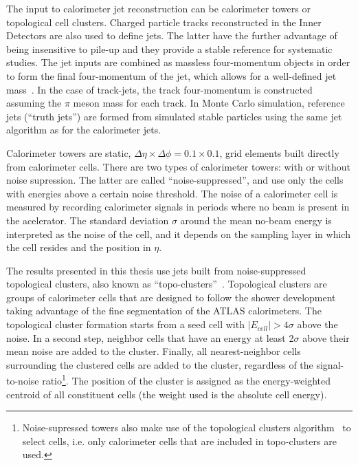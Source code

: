 The input to calorimeter jet reconstruction can be calorimeter towers or topological cell clusters. Charged particle tracks reconstructed in the Inner Detectors are also used to define jets. The latter have the further advantage of being insensitive to pile-up and they provide a stable reference for systematic studies. The jet inputs are combined as massless four-momentum objects in order to form the final four-momentum of the jet, which allows for a well-defined jet mass~\cite{Busato:1271710}. In the case of track-jets, the track four-momentum is constructed assuming the $\pi$ meson mass for each track.  In Monte Carlo simulation, reference jets (``truth jets'') are formed from simulated stable particles using the same jet algorithm as for the calorimeter jets. 


Calorimeter towers are static, $\Delta \eta \times \Delta \phi = 0.1 \times 0.1$, grid elements built directly from calorimeter cells. There are two types of calorimeter towers: with or without noise supression. The latter are called ``noise-suppressed'', %
and use only the cells with energies above a certain noise threshold.  The noise of a calorimeter cell is measured by recording calorimeter signals in periods where no beam is present in the acelerator.  The standard deviation $\sigma$ around the mean %
no-beam energy is interpreted as the noise of the cell, and it depends on the sampling layer in which the cell resides and the position in $\eta$.

The results presented in this thesis use jets built from noise-suppressed topological clusters,  %
also known as ``topo-clusters''~\cite{topoClusters}. Topological clusters are groups of calorimeter cells that are designed to follow the shower development taking advantage of the fine segmentation of the ATLAS calorimeters. The topological cluster formation starts from a seed cell with $|E_{cell}| > 4 \sigma$ above the noise. In a second step, neighbor cells that have an energy at least 2$\sigma$ above their mean noise are added to the cluster. Finally, all nearest-neighbor cells surrounding the clustered cells are added to the cluster, regardless of the signal-to-noise ratio\footnote{Noise-supressed towers also make use of the topological clusters algorithm~\cite{topoClusters} to select cells, i.e. only calorimeter cells that are included in topo-clusters are used.}. The position of the cluster is assigned as the energy-weighted centroid of all constituent cells (the weight used is the absolute cell energy).


